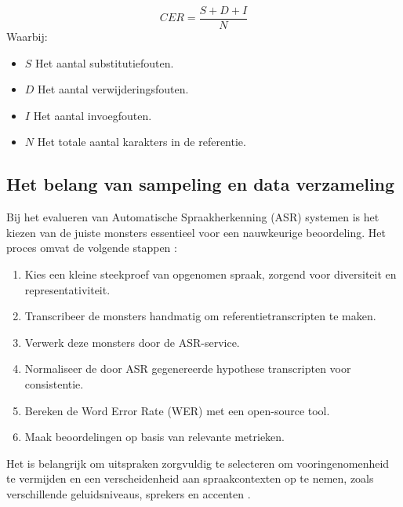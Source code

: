 \begin{equation}
    CER = \frac{S + D + I}{N}
\end{equation}
Waarbij:
\begin{itemize}
    \item $S$ Het aantal substitutiefouten.
    \item $D$ Het aantal verwijderingsfouten.
    \item $I$ Het aantal invoegfouten.
    \item $N$ Het totale aantal karakters in de referentie.
\end{itemize}

\subsection{Het belang van sampeling en data verzameling}
Bij het evalueren van Automatische Spraakherkenning (ASR) systemen is het kiezen van de juiste monsters essentieel voor een nauwkeurige beoordeling. Het proces omvat de volgende stappen \autocite{awsmlblog2023}:

\begin{enumerate}
    \item Kies een kleine steekproef van opgenomen spraak, zorgend voor diversiteit en representativiteit.
    \item Transcribeer de monsters handmatig om referentietranscripten te maken.
    \item Verwerk deze monsters door de ASR-service.
    \item Normaliseer de door ASR gegenereerde hypothese transcripten voor consistentie.
    \item Bereken de Word Error Rate (WER) met een open-source tool.
    \item Maak beoordelingen op basis van relevante metrieken.
\end{enumerate}

Het is belangrijk om uitspraken zorgvuldig te selecteren om vooringenomenheid te vermijden en een verscheidenheid aan spraakcontexten op te nemen, zoals verschillende geluidsniveaus, sprekers en accenten \autocite{awsmlblog2023}.


